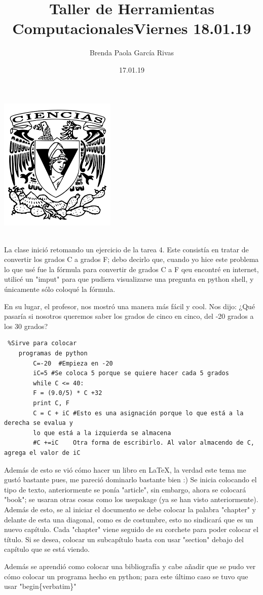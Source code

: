\documentclass{article}
\title{\huge \color{red}Taller de Herramientas Computacionales}
\author{Brenda Paola García Rivas}
\date{17.01.19}
\begin{document}
	\maketitle
	\begin{center}
		\includegraphics[scale=1.0]{1.png}
	\end{center}

	\newpage
	\title{\huge Viernes 18.01.19}\\
	
	La clase inició retomando un ejercicio de la tarea 4. Este consistía en tratar de convertir los grados C a grados F; debo decirlo que, cuando yo hice este problema lo que usé fue la fórmula para convertir de grados C a F qeu encontré en internet, utilicé un "imput" para que pudiera visualizarse una pregunta en python shell, y únicamente sólo coloqué la fórmula.
	
	En su lugar, el profesor, nos mostró una manera más fácil y cool. 
	Nos dijo: ¿Qué pasaría si nosotros queremos saber los grados de cinco en cinco, del -20 grados a los 30 grados?
	
	\begin{verbatim} %Sirve para colocar 
	programas de python
		C=-20  #Empieza en -20
		iC=5 #Se coloca 5 porque se quiere hacer cada 5 grados
		while C <= 40:
		F = (9.0/5) * C +32
		print C, F
		C = C + iC #Esto es una asignación porque lo que está a la derecha se evalua y 
		lo que está a la izquierda se almacena
		#C +=iC    Otra forma de escribirlo. Al valor almacendo de C, agrega el valor de iC
	\end{verbatim}
	
	Además de esto se vió cómo hacer un libro en LaTeX, la verdad este tema me gustó bastante pues, me pareció dominarlo bastante bien :)
	Se inicia colocando el tipo de texto, anteriormente se ponía "article", sin embargo, ahora se colocará "book"; se usaran otras cosas como los usepakage (ya se han visto anteriormente).
	Además de esto, se al iniciar el documento se debe colocar la palabra "chapter" y delante de esta una diagonal, como es de costumbre, esto no sindicará que es un nuevo capítulo.
	Cada "chapter" viene seguido de su corchete para poder colocar el título.
	Si se desea, colocar un subcapítulo basta con usar "section" debajo del capítulo que se está viendo.
	
	Además se aprendió como colocar una bibliografía y cabe añadir que se pudo ver cómo colocar un programa hecho en python; para este último caso se tuvo que usar "begin\{verbatim\}" 
\end{document}
